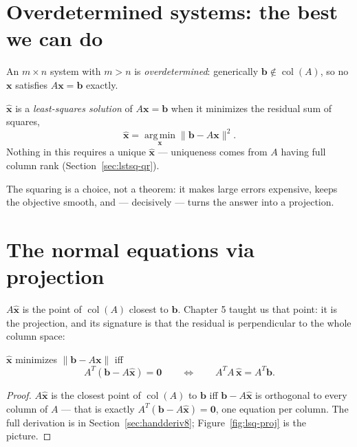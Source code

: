\section{Overdetermined systems: the best we can do}\label{sec:lstsq-over}

An $m\times n$ system with $m>n$ is \emph{overdetermined}: generically
$\mathbf b\notin\operatorname{col}(A)$, so no $\mathbf x$ satisfies
$A\mathbf x=\mathbf b$ exactly.

\begin{definition}
$\hat{\mathbf x}$ is a \emph{least-squares solution} of
$A\mathbf x=\mathbf b$ when it minimizes the residual sum of squares,
\[
\hat{\mathbf x}=\operatorname*{arg\,min}_{\mathbf x}
\lVert \mathbf b-A\mathbf x\rVert^{2}.
\]
Nothing in this requires a unique $\hat{\mathbf x}$ --- uniqueness comes
from $A$ having full column rank (Section~\ref{sec:lstsq-qr}).
\end{definition}

The squaring is a choice, not a theorem: it makes large errors expensive,
keeps the objective smooth, and --- decisively --- turns the answer into a
projection.

\section{The normal equations via projection}\label{sec:lstsq-normal}

$A\hat{\mathbf x}$ is the point of $\operatorname{col}(A)$ closest to
$\mathbf b$. Chapter 5 taught us that point: it is the projection, and its
signature is that the residual is perpendicular to the whole column space:

\begin{theorem}
$\hat{\mathbf x}$ minimizes $\lVert\mathbf b-A\mathbf x\rVert$ iff
\[
A^{T}(\mathbf b-A\hat{\mathbf x})=\mathbf0
\qquad\Longleftrightarrow\qquad
A^{T}A\,\hat{\mathbf x}=A^{T}\mathbf b .
\]
\end{theorem}

\begin{proof}
$A\hat{\mathbf x}$ is the closest point of $\operatorname{col}(A)$ to
$\mathbf b$ iff $\mathbf b-A\hat{\mathbf x}$ is orthogonal to every column
of $A$ --- that is exactly $A^{T}(\mathbf b-A\hat{\mathbf x})=\mathbf0$,
one equation per column. The full derivation is in
Section~\ref{sec:handderiv8}; Figure~\ref{fig:lsq-proj} is the picture.
\end{proof}

